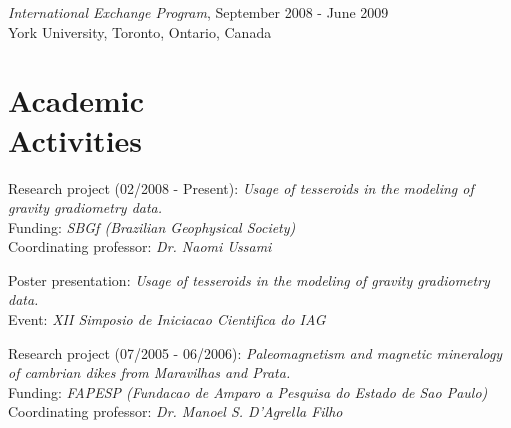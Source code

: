 \documentclass[margin,line]{resume}
\begin{document}
\begin{resume}
\begin{list1}
        \item[] \textit{International Exchange Program}, September 2008 - June 2009\\
        York University, Toronto, Ontario, Canada\vspace{2mm}%

        \end{list1}

		\section{\mysidestyle Academic\\Activities}
		
		\begin{list1}
		
		\item[] Research project (02/2008 - Present): \textit{Usage of tesseroids in the modeling of gravity gradiometry data.}\\
						Funding: \textit{SBGf (Brazilian Geophysical Society)}\\
						Coordinating professor: \textit{Dr. Naomi Ussami}\\

		\item[] Poster presentation: \textit{Usage of tesseroids in the modeling of gravity gradiometry data.}\\ 
                        Event: \textit{XII Simposio de Iniciacao Cientifica do IAG}\\

		\item[] Research project (07/2005 - 06/2006): \textit{Paleomagnetism and magnetic mineralogy of cambrian dikes from Maravilhas and Prata.}\\
						Funding: \textit{FAPESP (Fundacao de Amparo a Pesquisa do Estado de Sao Paulo)}\\
						Coordinating professor: \textit{Dr. Manoel S. D'Agrella Filho}\\


\end{list1}
\end{resume}
\end{document}
